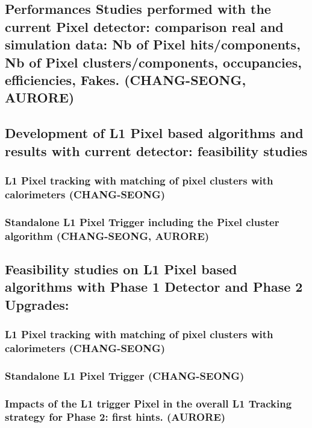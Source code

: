 \subsection{Performances Studies performed with the current Pixel detector: comparison real and simulation data: Nb of Pixel hits/components, Nb of Pixel clusters/components, occupancies, efficiencies, Fakes.
  (CHANG-SEONG, AURORE)}
\subsection{Development of L1 Pixel based algorithms and results with current detector: feasibility studies}
\subsubsection{L1 Pixel tracking with matching of pixel clusters with calorimeters (CHANG-SEONG)}
\subsubsection{Standalone L1 Pixel Trigger including the Pixel cluster algorithm (CHANG-SEONG, AURORE)}

\subsection{Feasibility studies on L1 Pixel based algorithms with Phase 1 Detector and Phase 2 Upgrades:}
\subsubsection{L1 Pixel tracking with matching of pixel clusters with calorimeters (CHANG-SEONG)}
\subsubsection{Standalone L1 Pixel Trigger (CHANG-SEONG)}
\subsubsection{Impacts of the L1 trigger Pixel in the overall L1 Tracking strategy for Phase 2: first hints. (AURORE)}
